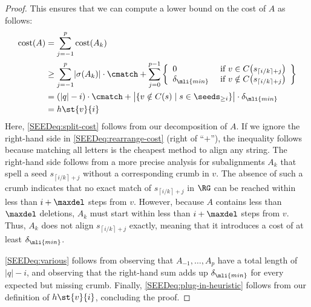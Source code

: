 \begin{proof}
	This ensures that we can compute a lower bound on the cost of $A$ as
	follows:
	\begin{align}
		\text{cost}(A) 
		&= \sum_{j=-1}^{p} \text{cost}(A_k) \label{SEEDeq:split-cost} \\
		&\geq \sum_{j=-1}^{p} \lvert \sigma(A_k) \rvert \cdot \cmatch + \sum_{j=0}^{p-1} \left\{ \begin{array}{ll}
			0 & \text{ if } v \in C\!\left(s_{\left\lceil i/k \right\rceil + j}\right) \\
			\delta_\mli{min} & \text{ if } v \notin C\!\left(s_{\left\lceil i/k \right\rceil + j}\right)
		\end{array}\right\} \label{SEEDeq:rearrange-cost} \\
		&= (\lvert q \rvert - i) \cdot \cmatch + \big\lvert \{v \notin C(s) \mid s \in \seeds_{\geq i}\} \big\rvert \cdot \delta_\mli{min} \label{SEEDeq:various} \\
		&= h\st{v}{i} \label{SEEDeq:plug-in-heuristic}
	\end{align}
	Here, \cref{SEEDeq:split-cost} follows from our decomposition of $A$. If we
	ignore the right-hand side in \cref{SEEDeq:rearrange-cost} (right of ``$+$''),
	the inequality follows because matching all letters is the cheapest method
	to align any string. The right-hand side follows from a more precise
	analysis for subalignments $A_k$ that spell a seed $s_{\left\lceil i/k
	\right\rceil + j}$ without a corresponding crumb in $v$. The absence of such
	a crumb indicates that no exact match of $s_{\left\lceil i/k \right\rceil +
	j}$ in $\RG$ can be reached within less than $i + \maxdel$ steps from $v$.
	However, because $A$ contains less than $\maxdel$ deletions, $A_k$ must
	start within less than $i + \maxdel$ steps from $v$. Thus, $A_k$ does not
	align $s_{\left\lceil i/k \right\rceil + j}$ exactly, meaning that it
	introduces a cost of at least $\delta_\mli{min}$.

	\cref{SEEDeq:various} follows from observing that $A_{-1}, \dots, A_p$ have a
	total length of $|q|-i$, and observing that the right-hand sum adds up
	$\delta_{\mli{min}}$ for every expected but missing crumb.
	Finally, \cref{SEEDeq:plug-in-heuristic} follows from our definition of
	$h\st{v}{i}$, concluding the proof.
	\qedwhite
\end{proof}
